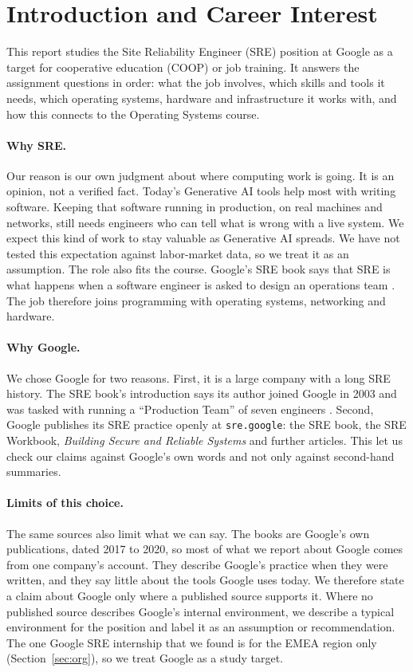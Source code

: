 \section{Introduction and Career Interest}

This report studies the Site Reliability Engineer (SRE) position at Google as a target for cooperative education (COOP) or job training. It answers the assignment questions in order: what the job involves, which skills and tools it needs, which operating systems, hardware and infrastructure it works with, and how this connects to the Operating Systems course.

\paragraph{Why SRE.}
Our reason is our own judgment about where computing work is going. It is an opinion, not a verified fact. Today's Generative AI tools help most with writing software. Keeping that software running in production, on real machines and networks, still needs engineers who can tell what is wrong with a live system. We expect this kind of work to stay valuable as Generative AI spreads. We have not tested this expectation against labor-market data, so we treat it as an assumption. The role also fits the course. Google's SRE book says that SRE is what happens when a software engineer is asked to design an operations team \cite{sre-book}. The job therefore joins programming with operating systems, networking and hardware.

\paragraph{Why Google.}
We chose Google for two reasons. First, it is a large company with a long SRE history. The SRE book's introduction says its author joined Google in 2003 and was tasked with running a ``Production Team'' of seven engineers \cite{sre-book}. Second, Google publishes its SRE practice openly at \texttt{sre.google}: the SRE book, the SRE Workbook, \emph{Building Secure and Reliable Systems} and further articles. This let us check our claims against Google's own words and not only against second-hand summaries.

\paragraph{Limits of this choice.}
The same sources also limit what we can say. The books are Google's own publications, dated 2017 to 2020, so most of what we report about Google comes from one company's account. They describe Google's practice when they were written, and they say little about the tools Google uses today. We therefore state a claim about Google only where a published source supports it. Where no published source describes Google's internal environment, we describe a typical environment for the position and label it as an assumption or recommendation. The one Google SRE internship that we found is for the EMEA region only (Section~\ref{sec:org}), so we treat Google as a study target.
